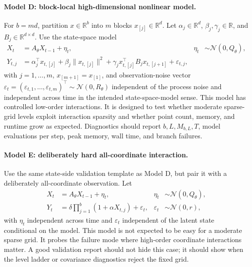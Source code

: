 \documentclass[11pt]{article}
\numberwithin{equation}{section}
\newcommand{\R}{\mathbb R}
\newcommand{\N}{\mathcal N}
\begin{document}
\paragraph{Model D: block-local high-dimensional nonlinear model.}
For \(b=md\), partition \(x\in\R^b\) into \(m\) blocks \(x_{[j]}\in\R^d\).
Let \(\alpha_j\in\R^d\), \(\beta_j,\gamma_j\in\R\), and
\(B_j\in\R^{d\times d}\).  Use the state-space model
\begin{align}
  X_t&=A_\theta X_{t-1}+\eta_t,
  &
  \eta_t&\sim\N(0,Q_\theta),
  \label{eq:p32-test-block-state}\\
  Y_{t,j}
  &=
  \alpha_j^\top x_{t,[j]}
  +\beta_j\|x_{t,[j]}\|^2
  +\gamma_j x_{t,[j]}^\top B_jx_{t,[j+1]}
  +\varepsilon_{t,j},
  \label{eq:p32-test-block-obs}
\end{align}
with \(j=1,\ldots,m\), \(x_{[m+1]}=x_{[1]}\), and observation-noise vector
\(\varepsilon_t=(\varepsilon_{t,1},\ldots,\varepsilon_{t,m})^\top\sim\N(0,R_\theta)\)
independent of the process noise and independent across time in the intended
state-space-model sense.  This model has controlled low-order interactions.  It
is designed to test whether moderate sparse-grid levels exploit interaction
sparsity and whether point count, memory, and runtime grow as expected.  Diagnostics should report \(b,L,M_{b,L},T\), model
evaluations per step, peak memory, wall time, and branch failures.

\paragraph{Model E: deliberately hard all-coordinate interaction.}
Use the same state-side validation template as Model D, but pair it with a
deliberately all-coordinate observation.  Let
\begin{align}
  X_t&=A_\theta X_{t-1}+\eta_t,
  &
  \eta_t&\sim\N(0,Q_\theta),
  \label{eq:p32-test-hard-state}\\
  Y_t
  &=
  \delta\prod_{j=1}^b(1+\alpha X_{t,j})+\varepsilon_t,
  &
  \varepsilon_t&\sim\N(0,r),
  \label{eq:p32-test-hard}
\end{align}
with $\eta_t$ independent across time and $\varepsilon_t$ independent of the
latent state conditional on the model.  This model is not expected to be easy
for a moderate sparse grid.  It probes the failure mode where high-order
coordinate interactions matter.  A good validation report should not hide this
case; it should show when the level ladder or covariance diagnostics reject the
fixed grid.
\end{document}
